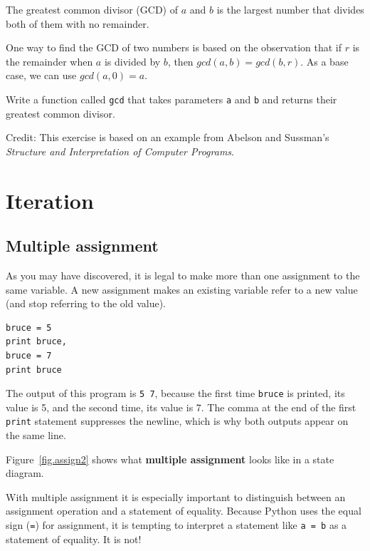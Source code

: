 \documentclass[10pt]{book}
\begin{document}
\begin{exercise}

The greatest common divisor (GCD) of $a$ and $b$ is the largest number
that divides both of them with no remainder.  

One way to find the GCD of two numbers is based on the observation
that if $r$ is the remainder when $a$ is divided by $b$, then $gcd(a,
b) = gcd(b, r)$.  As a base case, we can use $gcd(a, 0) = a$.

Write a function called
\verb"gcd" that takes parameters {\tt a} and {\tt b}
and returns their greatest common divisor.

Credit: This exercise is based on an example from Abelson and
Sussman's {\em Structure and Interpretation of Computer Programs}.

\end{exercise}


\chapter{Iteration}

\section{Multiple assignment}

As you may have discovered, it is legal to
make more than one assignment to the same variable.  A
new assignment makes an existing variable refer to a new
value (and stop referring to the old value).

\begin{verbatim}
bruce = 5
print bruce,
bruce = 7
print bruce
\end{verbatim}
%
The output of this program is {\tt 5 7}, because the first time
{\tt bruce} is printed, its value is 5, and the second time, its
value is 7.  The
comma at the end of the first {\tt print} statement suppresses
the newline, which is why both outputs
appear on the same line.

Figure~\ref{fig.assign2} shows what {\bf multiple assignment} looks
like in a state diagram.  

With multiple assignment it is especially important to distinguish
between an assignment operation and a statement of equality.  Because
Python uses the equal sign ({\tt =}) for assignment, it is tempting to
interpret a statement like {\tt a = b} as a statement of equality. It
is not!
\end{document}
